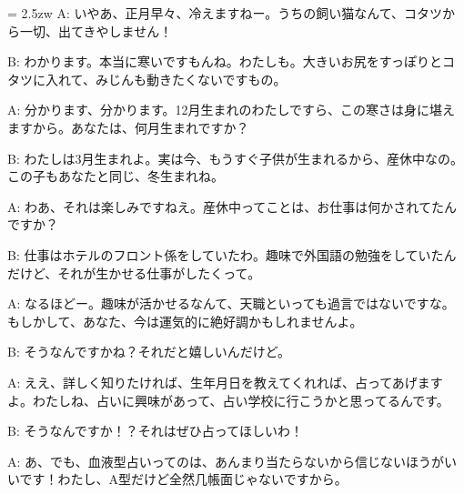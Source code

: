 \documentclass[11pt]{amsart}
\title{}
\author{}
\newenvironment{hangall}[1]{\hangindent = 2.5zw\everypar{\hangindent = 2.5zw}}{}
\begin{document}
\maketitle
\begin{hangall}{}%
A: いやあ、正月早々、冷えますねー。うちの飼い猫なんて、コタツから一切、出てきやしません！

B: わかります。本当に寒いですもんね。わたしも。大きいお尻をすっぽりとコタツに入れて、みじんも動きたくないですもの。

A: 分かります、分かります。12月生まれのわたしですら、この寒さは身に堪えますから。あなたは、何月生まれですか？

B: わたしは3月生まれよ。実は今、もうすぐ子供が生まれるから、産休中なの。この子もあなたと同じ、冬生まれね。

A: わあ、それは楽しみですねえ。産休中ってことは、お仕事は何かされてたんですか？

B: 仕事はホテルのフロント係をしていたわ。趣味で外国語の勉強をしていたんだけど、それが生かせる仕事がしたくって。

A: なるほどー。趣味が活かせるなんて、天職といっても過言ではないですな。もしかして、あなた、今は運気的に絶好調かもしれませんよ。

B: そうなんですかね？それだと嬉しいんだけど。

A: ええ、詳しく知りたければ、生年月日を教えてくれれば、占ってあげますよ。わたしね、占いに興味があって、占い学校に行こうかと思ってるんです。

B: そうなんですか！？それはぜひ占ってほしいわ！

A: あ、でも、血液型占いってのは、あんまり当たらないから信じないほうがいいです！わたし、A型だけど全然几帳面じゃないですから。
\end{hangall}
\end{document}
